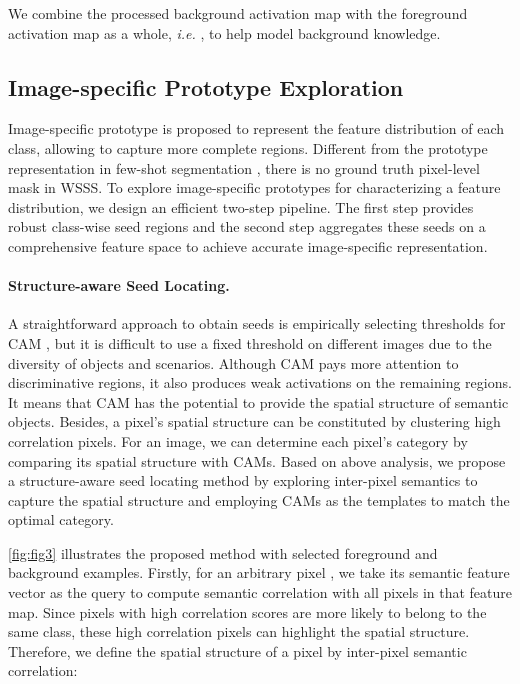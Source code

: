 \documentclass[10pt,twocolumn,letterpaper]{article}
\begin{document}
We combine the processed background activation map with the foreground activation map as a whole, \textit{i.e.} , to help model background knowledge.

\subsection{Image-specific Prototype Exploration}
Image-specific prototype is proposed to represent the feature distribution of each class, allowing to capture more complete regions.
Different from the prototype representation in few-shot segmentation \cite{wang2019panet,liu2020part,zhang2020sg}, there is no ground truth pixel-level mask in WSSS.
To explore image-specific prototypes for characterizing a feature distribution, we design an efficient two-step pipeline.
The first step provides robust class-wise seed regions and the second step aggregates these seeds on a comprehensive feature space to achieve accurate image-specific representation.


\paragraph{Structure-aware Seed Locating.}
A straightforward approach to obtain seeds is empirically selecting thresholds for CAM \cite{huang2018weakly}, but it is difficult to use a fixed threshold on different images due to the diversity of objects and scenarios.
Although CAM pays more attention to discriminative regions, it also produces weak activations on the remaining regions.
It means that CAM has the potential to provide the spatial structure of semantic objects.
Besides, a pixel's spatial structure can be constituted by clustering high correlation pixels.
For an image, we can determine each pixel's category by comparing its spatial structure with CAMs.
Based on above analysis, we propose a structure-aware seed locating method by exploring inter-pixel semantics to capture the spatial structure and employing CAMs as the templates to match the optimal category.

\cref{fig:fig3} illustrates the proposed method with selected foreground and background examples.
Firstly, for an arbitrary pixel , we take its semantic feature vector  as the query to compute semantic correlation with all pixels in that feature map.
Since pixels with high correlation scores are more likely to belong to the same class, these high correlation pixels can highlight the spatial structure.
Therefore, we define the spatial structure of a pixel by inter-pixel semantic correlation:
\end{document}
